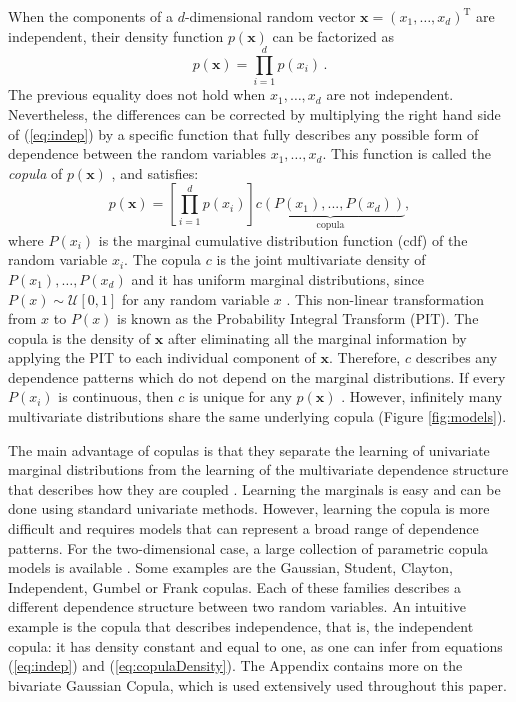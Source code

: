 \documentclass{article}
\begin{document}
When the components of a $d$-dimensional random vector
$\mathbf{x}=(x_1,\ldots,x_d)^\text{T}$ are independent, their density function
$p(\mathbf{x})$ can be factorized as
\begin{equation}
p(\mathbf{x}) = \prod_{i=1}^{d} p(x_i)\,.\label{eq:indep}
\end{equation}
The previous equality does not hold when $x_1,\ldots,x_d$ are not independent.
Nevertheless, the differences can be corrected by multiplying the right hand
side of (\ref{eq:indep}) by a specific function that fully describes any
possible form of dependence between the random variables $x_1,\ldots,x_d$. This
function is called the \emph{copula} of $p(\mathbf{x})$ \cite{Nelsen2006}, and
satisfies:
\begin{equation}
p(\mathbf{x}) =
\left[\prod_{i=1}^{d} p(x_i)\right]
\underbrace{c(P(x_1),..., P(x_d))}_\text{copula},
\label{eq:copulaDensity}
\end{equation}
where $P(x_i)$ is the marginal cumulative distribution function (cdf) of the
random variable $x_i$.  The copula $c$ is the joint multivariate density of
$P(x_1),\ldots,P(x_d)$ and it has uniform marginal distributions, since $P(x)
\sim \mathcal{U}[0,1]$ for any random variable $x$ \cite{CaseBerg2001}.  This
non-linear transformation from $x$ to $P(x)$ is known as the
Probability Integral Transform (PIT).  The copula is the density of
$\mathbf{x}$ after eliminating all the marginal information by applying the PIT
to each individual component of $\mathbf{x}$.  Therefore, $c$ describes any
dependence patterns which do not depend on the marginal distributions. If every
$P(x_i)$ is continuous, then $c$ is unique for any $p(\mathbf{x})$
\cite{sklar}. However, infinitely many multivariate distributions share the same
underlying copula (Figure \ref{fig:models}). 

The main advantage of copulas is that they separate the learning of univariate
marginal distributions from the learning of the multivariate dependence
structure that describes how they are coupled \cite{Joe2005}.  Learning the
marginals is easy and can be done using standard univariate methods. However,
learning the copula is more difficult and requires models that can represent a
broad range of dependence patterns.  For the two-dimensional case, a large
collection of parametric copula models is available \cite{Nelsen2006}.  Some
examples are the Gaussian, Student, Clayton, Independent, Gumbel or Frank
copulas.  Each of these families describes a different dependence structure
between two random variables. An intuitive example is the copula that describes
independence, that is, the independent copula: it has density constant and
equal to one, as one can infer from equations (\ref{eq:indep}) and
(\ref{eq:copulaDensity}).  The Appendix contains more on the bivariate Gaussian
Copula, which is used extensively used throughout this paper. 
\end{document}
